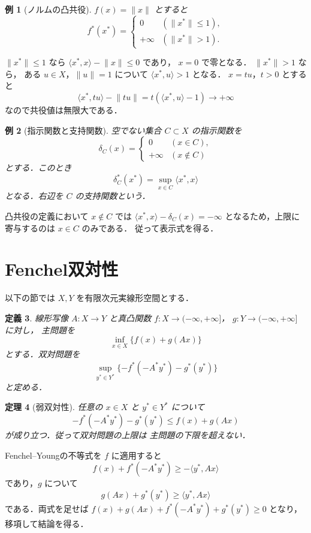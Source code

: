 \documentclass[a5paper,10pt,onecolumn]{jsarticle}
\makeatletter
\theoremstyle{mathnotetheorem}
\newtheorem{theorem}{定理}[section]
\newtheorem{definition}[theorem]{定義}
\newtheorem{example}[theorem]{例}
\renewcommand{\proofname}{証明}
\renewenvironment{proof}[1][\proofname]{%
  \par\pushQED{\qed}\normalfont\topsep4\p@\@plus2\p@\relax
  \trivlist\item[\hskip\labelsep\bfseries #1]\ignorespaces
}{\popQED\endtrivlist\@endpefalse}
\newcommand{\norm}[1]{\lVert #1\rVert}
\makeatother
\begin{document}
\begin{example}[ノルムの凸共役]\label{ex:norm-conjugate}
$f(x)=\norm x$ とすると
\[
 f^*(x^*)=
 \begin{cases}
 0&(\norm{x^*}\le1),\\
 +\infty&(\norm{x^*}>1).
 \end{cases}
\]
\end{example}
\begin{proof}
$\norm{x^*}\le1$ なら
$\langle x^*,x\rangle-\norm x\le0$ であり，
$x=0$ で零となる．
$\norm{x^*}>1$ なら，
ある $u\in X$，$\norm u=1$ について
$\langle x^*,u\rangle>1$ となる．
$x=tu$，$t>0$ とすると
\[
 \langle x^*,tu\rangle-\norm{tu}
 =t(\langle x^*,u\rangle-1)\longrightarrow+\infty
\]
なので共役値は無限大である．
\end{proof}

\begin{example}[指示関数と支持関数]\label{ex:indicator}
空でない集合 $C\subset X$ の指示関数を
\[
 \delta_C(x)=\begin{cases}0&(x\in C),\\+\infty&(x\notin C)\end{cases}
\]
とする．このとき
\[
 \delta_C^*(x^*)=\sup_{x\in C}\langle x^*,x\rangle
\]
となる．右辺を $C$ の支持関数という．
\end{example}
\begin{proof}
凸共役の定義において $x\notin C$ では
$\langle x^*,x\rangle-\delta_C(x)=-\infty$
となるため，上限に寄与するのは $x\in C$ のみである．
従って表示式を得る．
\end{proof}

\section{Fenchel双対性}

以下の節では $X,Y$ を有限次元実線形空間とする．
\begin{definition}
線形写像 $A:X\to Y$ と真凸関数
$f:X\to(-\infty,+\infty]$，
$g:Y\to(-\infty,+\infty]$ に対し，
主問題を
\[
 \inf_{x\in X}\{f(x)+g(Ax)\}
 \tag{P}
\]
とする．双対問題を
\[
 \sup_{y^*\in Y^*}
 \{-f^*(-A^*y^*)-g^*(y^*)\}
 \tag{D}
\]
と定める．
\end{definition}

\begin{theorem}[弱双対性]\label{thm:weak-duality}
任意の $x\in X$ と $y^*\in Y^*$ について
\[
 -f^*(-A^*y^*)-g^*(y^*)
 \le f(x)+g(Ax)
\]
が成り立つ．従って双対問題の上限は
主問題の下限を超えない．
\end{theorem}
\begin{proof}
Fenchel--Youngの不等式を $f$ に適用すると
\[
 f(x)+f^*(-A^*y^*)\ge-\langle y^*,Ax\rangle
\]
であり，$g$ について
\[
 g(Ax)+g^*(y^*)\ge\langle y^*,Ax\rangle
\]
である．両式を足せば
$f(x)+g(Ax)+f^*(-A^*y^*)+g^*(y^*)\ge0$
となり，移項して結論を得る．
\end{proof}
\end{document}
